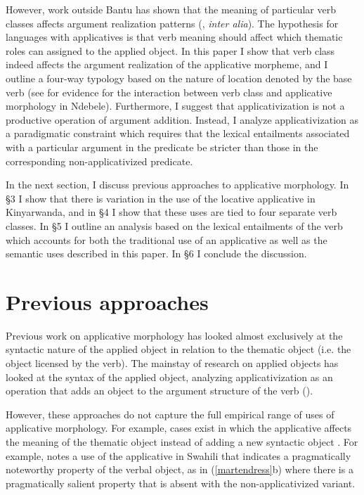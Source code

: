 \documentclass[output=paper]{langsci/langscibook}
\begin{document}
 However, work outside Bantu has shown that the meaning of particular verb classes affects argument realization patterns (\citealt{fillmore:1970,levin:1993, lrh:2008a, beavers:2011a}, \emph{inter alia}). The hypothesis for languages with applicatives is that verb meaning should affect which thematic roles can assigned to the applied object. In this paper I show that verb class indeed affects the argument realization of the applicative morpheme, and I outline a four-way typology based on the nature of location denoted by the base verb (see \citet{sibanda:2016} for evidence for the interaction between verb class and applicative morphology in Ndebele). Furthermore, I suggest that applicativization is not a productive operation of argument addition. Instead, I analyze applicativization as a paradigmatic constraint which requires that the lexical entailments associated with a particular argument in the predicate be stricter than those in the corresponding non-applicativized predicate.
 
 
In the next section, I discuss previous approaches to applicative morphology. In \S3 I show that there is variation in the use of the locative applicative in Kinyarwanda, and in \S4 I show that these uses are tied to four separate verb classes. In \S5 I outline an analysis based on the lexical entailments of the verb which accounts for both the traditional use of an applicative as well as the semantic uses described in this paper. In \S6 I conclude the discussion.
	 
 

\section{Previous approaches} %
 

 Previous work on applicative morphology has looked almost exclusively at the syntactic nature of the applied object in relation to the thematic object (i.e. the object licensed by the verb). The mainstay of research on applied objects has looked at the syntax of the applied object, analyzing applicativization as an operation that adds an object to the argument structure of the verb (\citealt{baker:1988, bresnan:1990, alsina:1992, alsina:1993, marantz:1993, pylkkanen:2008, mcginnis:2001, mcginnis:2003, baker:2006, zeller:2006, zellerngoboka:2006, peterson:2007, jeong:2007, bakeretal:2012, jerro:2015}).  
  
However, these approaches do not capture the full empirical range of uses of applicative morphology. For example, cases exist in which the applicative affects the meaning of the thematic object instead of adding a new syntactic object \citep{marten:2003, creissels:2004, cannmabugu:2006, bond:2009}. For example, \citet{marten:2003} notes a use of the applicative in Swahili that indicates a pragmatically noteworthy property of the verbal object, as in (\ref{martendress}b) where there is a pragmatically salient property that is absent with the non-applicativized variant.
\end{document}
